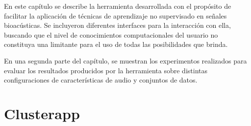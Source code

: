 En este capítulo se describe la herramienta desarrollada con el propósito de facilitar la aplicación de técnicas de aprendizaje no supervisado en señales bioacústicas.
Se incluyeron diferentes interfaces para la interacción con ella, buscando que el nivel de conocimientos computacionales del usuario no constituya una limitante para el uso de todas las posibilidades que brinda.

En una segunda parte del capítulo, se muestran los experimentos realizados para evaluar los resultados producidos por la herramienta sobre distintas configuraciones de características de audio y conjuntos de datos.

\section{Clusterapp}\label{sec:clusterapp}




